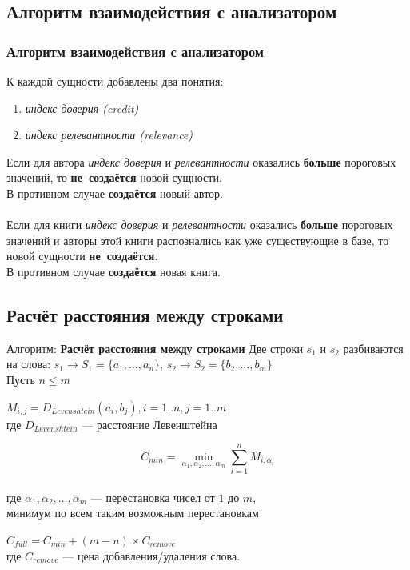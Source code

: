 \documentclass[utf8,handout]{beamer}
\begin{document}
	\subsection{Алгоритм взаимодействия с анализатором}
	\begin{frame}
 		\frametitle{Алгоритм взаимодействия с анализатором}
 		\begin{block}{}
	 		К каждой сущности добавлены два понятия:
 			\begin{enumerate}
 				\item {\em индекс доверия (credit)}
 				\item {\em индекс релевантности (relevance)}
 			\end{enumerate}
 		\end{block}
 		\begin{block}{}
			Если для автора {\em индекс доверия} и {\em релевантности} оказались \textbf{больше} пороговых значений, то
			\textbf{не~создаётся} новой сущности.\\
			В противном случае \textbf{создаётся} новый автор.\\
			~ \\
			Если для книги {\em индекс доверия} и {\em релевантности} оказались \textbf{больше} пороговых значений и
			авторы этой книги распознались как уже существующие в базе, то новой сущности \textbf{не~создаётся}.\\
			В противном случае \textbf{создаётся} новая книга.
		\end{block}
 	\end{frame}


	\subsection{Расчёт расстояния между строками}
	\begin{frame}
 		\begin{block}{Алгоритм: \textbf{Расчёт расстояния между строками}}
 			Две строки $s_{1}$ и $s_{2}$ разбиваются на слова:
 			$s_{1}\rightarrow S_{1}=\lbrace a_{1},\ldots,a_{n}\rbrace$, $s_{2}\rightarrow S_{2}=\lbrace b_{2},\ldots,b_{m}\rbrace$ \\
 			Пусть $n\leq m$

			$ M_{i,j} = D_{Levenshtein}(a_{i},b_{j}), i=1..n, j=1..m $ \\
			где $D_{Levenshtein}$ --- расстояние Левенштейна
			
			\[	C_{min}=\min_{\alpha_1, \alpha_2, \ldots, \alpha_m}{\sum_{i=1}^{n} M_{i,\alpha_{i}}} \] \\
			где $\alpha_1, \alpha_2, \ldots, \alpha_m$ --- перестановка чисел от $1$ до $m$,\\
			минимум по всем таким возможным перестановкам

			$C_{full}=C_{min}+(m-n)\times C_{remove}$\\
			где $C_{remove}$ --- цена добавления/удаления слова.
		\end{block}
	\end{frame}
\end{document}

